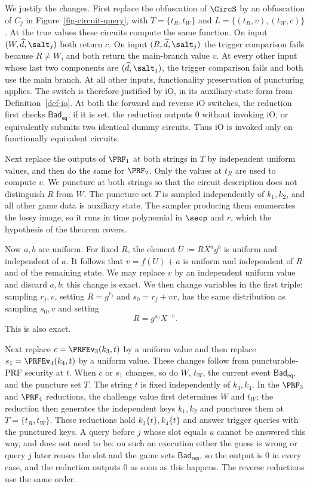 We justify the changes. First replace the obfuscation of $\CircS$ by an obfuscation of $C_j$ in Figure~\ref{fig-circuit-query}, with $T=\{t_R,t_W\}$ and $L=\{(t_R,v),(t_W,c)\}$. At the true values these circuits compute the same function. On input $(W,\widehat d,\salt_j)$ both return $c$. On input $(R,\widehat d,\salt_j)$ the trigger comparison fails because $R\ne W$, and both return the main-branch value $v$. At every other input whose last two components are $(\widehat d,\salt_j)$, the trigger comparison fails and both use the main branch. At all other inputs, functionality preservation of puncturing applies. The switch is therefore justified by iO, in its auxiliary-state form from Definition~\ref{def-io}. At both the forward and reverse iO switches, the reduction first checks $\mathsf{Bad}_{\mathsf{eq}}$; if it is set, the reduction outputs 0 without invoking iO, or equivalently submits two identical dummy circuits. Thus iO is invoked only on functionally equivalent circuits.

Next replace the outputs of $\PRF_1$ at both strings in $T$ by independent uniform values, and then do the same for $\PRF_2$. Only the values at $t_R$ are used to compute $v$. We puncture at both strings so that the circuit description does not distinguish $R$ from $W$. The puncture set $T$ is sampled independently of $k_1,k_2$, and all other game data is auxiliary state. The sampler producing them enumerates the lossy image, so it runs in time polynomial in $\secp$ and $r$, which the hypothesis of the theorem covers.

Now $a,b$ are uniform. For fixed $R$, the element $U:=RX^ag^b$ is uniform and independent of $a$. It follows that $v=f(U)+a$ is uniform and independent of $R$ and of the remaining state. We may replace $v$ by an independent uniform value and discard $a,b$; this change is exact. We then change variables in the first triple: sampling $r_j,v$, setting $R=g^{r_j}$ and $s_0=r_j+vx$, has the same distribution as sampling $s_0,v$ and setting
$$
R=g^{s_0}X^{-v}.
$$
This is also exact.

Next replace $c=\PRFEv_3(k_3,t)$ by a uniform value and then replace $s_1=\PRFEv_4(k_4,t)$ by a uniform value. These changes follow from puncturable-PRF security at $t$. When $c$ or $s_1$ changes, so do $W$, $t_W$, the current event $\mathsf{Bad}_{\mathsf{eq}}$, and the puncture set $T$. The string $t$ is fixed independently of $k_3,k_4$. In the $\PRF_3$ and $\PRF_4$ reductions, the challenge value first determines $W$ and $t_W$; the reduction then generates the independent keys $k_1,k_2$ and punctures them at $T=\{t_R,t_W\}$. These reductions hold $k_3\{t\},k_4\{t\}$ and answer trigger queries with the punctured keys. A query before $j$ whose slot equals $u$ cannot be answered this way, and does not need to be: on such an execution either the guess is wrong or query $j$ later reuses the slot and the game sets $\mathsf{Bad}_{\mathsf{rep}}$, so the output is 0 in every case, and the reduction outputs 0 as soon as this happens. The reverse reductions use the same order.

